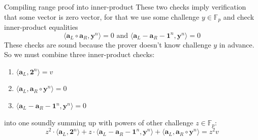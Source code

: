 \documentclass{zkdl-presentation-template}
\begin{document}
    \begin{frame}{Compiling range proof into inner-product}
        These two checks imply verification that some vector is zero vector, for that we use some challenge $y \in \mathbb{F}_p$ and check inner-product equalities $$\langle \mathbf{a}_L \circ \mathbf{a}_R, \mathbf{y}^n \rangle = 0 \text{ and } \langle \mathbf{a}_L - \mathbf{a}_R - \mathbf{1}^n, \mathbf{y}^n \rangle = 0$$
        These checks are sound because the prover doesn't know challenge $y$ in advance. \pause So we must combine three inner-product checks:
        \begin{enumerate}
        \item $\langle \mathbf{a}_L, \mathbf{2}^n \rangle = v$
        \item $\langle \mathbf{a}_L, \mathbf{a}_R \circ \mathbf{y}^n \rangle = 0$
        \item $\langle \mathbf{a}_L - \mathbf{a}_R - \mathbf{1}^n, \mathbf{y}^n \rangle = 0$
        \end{enumerate}
        \pause
        into one soundly summing up with powers of other challenge $z \in \mathbb{F}_p$:
        $$z^2 \cdot \langle \mathbf{a}_L, \mathbf{2}^n \rangle + z \cdot \langle \mathbf{a}_L - \mathbf{a}_R - \mathbf{1}^n, \mathbf{y}^n \rangle + \langle \mathbf{a}_L, \mathbf{a}_R \circ \mathbf{y}^n \rangle = z^2v$$
    \end{frame}
\end{document}
